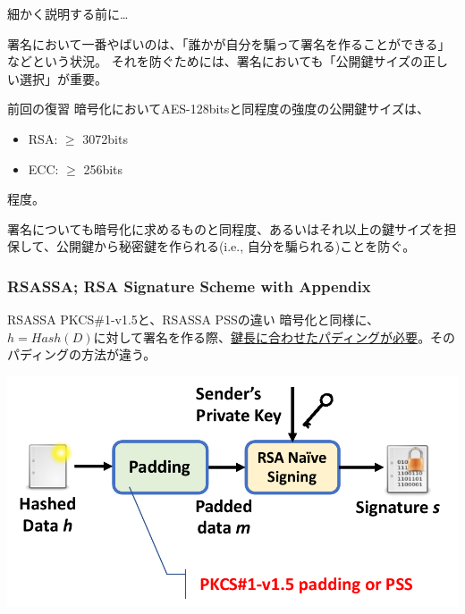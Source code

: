 \documentclass[12pt,dvipdfmx]{beamer}
\begin{document}
\begin{frame}
細かく説明する前に…


\vspace{2ex}

署名において一番やばいのは、「誰かが自分を騙って署名を作ることができる」などという状況。
それを防ぐためには、署名においても「公開鍵サイズの正しい選択」が重要。
\begin{block}{\small 前回の復習}
暗号化においてAES-128bitsと同程度の強度の公開鍵サイズは、
\begin{itemize}
\item RSA: $\geq$ 3072bits
\item ECC: $\geq$ 256bits
\end{itemize}
程度。
\end{block}
\alert{署名についても暗号化に求めるものと同程度、あるいはそれ以上の鍵サイズを担保}して、公開鍵から秘密鍵を作られる(i.e., 自分を騙られる)ことを防ぐ。
\end{frame}


\begin{frame}
\frametitle{RSASSA; RSA Signature Scheme with Appendix}
\begin{block}{\small RSASSA PKCS\#1-v1.5と、RSASSA PSSの違い}
暗号化と同様に、$h=\mathit{Hash}(D)$に対して署名を作る際、\underline{鍵長に合わせたパディングが必要}。そのパディングの方法が違う。
\end{block}

\begin{center}
\includegraphics[width=0.8\linewidth]{Figs/sig-rsa-padding.pdf}
\end{center}

\end{frame}
\end{document}
